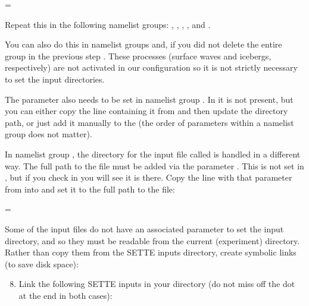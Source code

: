 \begin{enumerate}
\begingroup\tiny
\begin{VerbatimNML}
 =   
\end{VerbatimNML}
\endgroup

        Repeat this in the following namelist groups: , , , , and .

        You can also do this in namelist groups  and, if you did not delete the entire group in the previous step .
        These processes (surface waves and icebergs, respectively) are not activated in our configuration so it is not strictly necessary to set the input directories.

        The  parameter also needs to be set in namelist group .
        In  it is not present, but you can either copy the line containing it from  and then update the directory path, or just add it manually to the  (the order of parameters within a namelist group does not matter).

        In namelist group , the directory for the input file called  is handled in a different way.
        The full path to the file must be added via the parameter .
        This is not set in , but if you check in  you will see it is there.
        Copy the line with that parameter from  into  and set it to the full path to the  file:

\begingroup\scriptsize
\begin{VerbatimNML}
 = 
\end{VerbatimNML}
\endgroup

\end{enumerate}

Some of the input files do not have an associated parameter to set the input directory, and so they must be readable from the current (experiment) directory.
Rather than copy them from the SETTE inputs directory, create symbolic links (to save disk space):

\begin{enumerate}\setcounter{enumi}{7}
    \item Link the following SETTE inputs in your  directory (do not miss off the dot at the end in both cases):
\end{enumerate}

